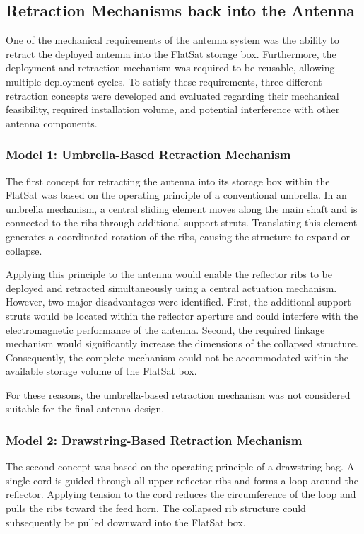 	
	\subsection{Retraction Mechanisms back into the Antenna}
	One of the mechanical requirements of the antenna system was the ability to retract the deployed antenna into the FlatSat storage box. Furthermore, the deployment and retraction mechanism was required to be reusable, allowing multiple deployment cycles. To satisfy these requirements, three different retraction concepts were developed and evaluated regarding their mechanical feasibility, required installation volume, and potential interference with other antenna components.
	
	
	\subsubsection{Model 1: Umbrella-Based Retraction Mechanism}
	
	The first concept for retracting the antenna into its storage box within the FlatSat was based on the operating principle of a conventional umbrella. In an umbrella mechanism, a central sliding element moves along the main shaft and is connected to the ribs through additional support struts. Translating this element generates a coordinated rotation of the ribs, causing the structure to expand or collapse.
	
	Applying this principle to the antenna would enable the reflector ribs to be deployed and retracted simultaneously using a central actuation mechanism. However, two major disadvantages were identified. First, the additional support struts would be located within the reflector aperture and could interfere with the electromagnetic performance of the antenna. Second, the required linkage mechanism would significantly increase the dimensions of the collapsed structure. Consequently, the complete mechanism could not be accommodated within the available storage volume of the FlatSat box.
	
	For these reasons, the umbrella-based retraction mechanism was not considered suitable for the final antenna design.

\subsubsection{Model 2: Drawstring-Based Retraction Mechanism}

The second concept was based on the operating principle of a drawstring bag. A single cord is guided through all upper reflector ribs and forms a loop around the reflector. Applying tension to the cord reduces the circumference of the loop and pulls the ribs toward the feed horn. The collapsed rib structure could subsequently be pulled downward into the FlatSat box.

